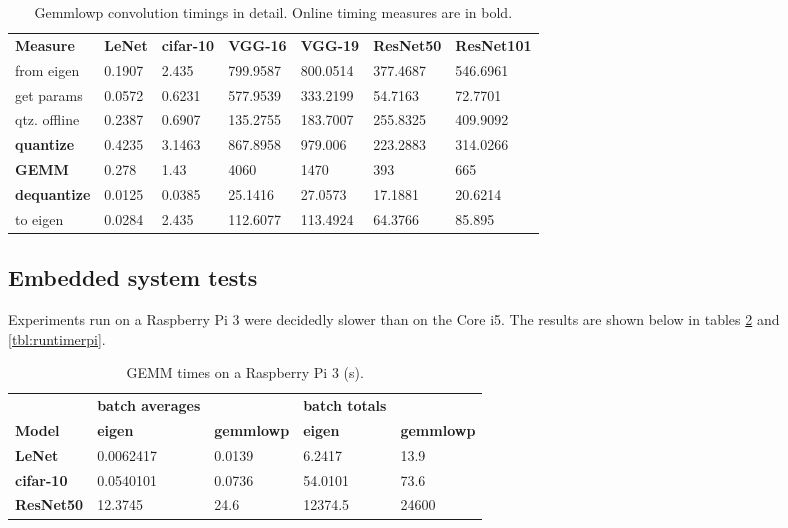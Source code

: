 \begin{table}[]
\centering
\caption[Gemmlowp convolution timings in detail]{Gemmlowp convolution timings in detail. Online timing measures are in bold.}
\label{tbl:detailedgemmlowp}
\begin{tabular}{lllllll}
\textbf{Measure}	& \textbf{LeNet} & \textbf{cifar-10} & \textbf{VGG-16} & \textbf{VGG-19} & \textbf{ResNet50} & \textbf{ResNet101} \\
from eigen & 0.1907         & 2.435              & 799.9587            & 800.0514            & 377.4687               & 546.6961                \\       
get params          & 0.0572         & 0.6231            & 577.9539         & 333.2199         & 54.7163           & 72.7701           \\
qtz. offline    & 0.2387         & 0.6907            & 135.2755        & 183.7007         & 255.8325          & 409.9092			\\   
\textbf{quantize}             & 0.4235         & 3.1463           & 867.8958        & 979.006        & 223.2883          & 314.0266            \\
\textbf{GEMM}                 & 0.278          & 1.43              & 4060            & 1470            & 393             & 665              \\       
\textbf{dequantize}           & 0.0125         & 0.0385            & 25.1416        & 27.0573        & 17.1881          & 20.6214            \\
to eigen   & 0.0284         & 2.435             & 112.6077       & 113.4924        & 64.3766          & 85.895    
\end{tabular}
\end{table}

\subsection{Embedded system tests}
Experiments run on a Raspberry Pi 3 were decidedly slower than on the Core i5. The results are shown below in tables \ref{tbl:gemmtimerpi} and \ref{tbl:runtimerpi}.

\begin{table}[]
\centering
\caption[Raspberry Pi GEMM timings]{GEMM times on a Raspberry Pi 3 (s).}
\label{tbl:gemmtimerpi}
\begin{tabular}{lllll}
                  & \textbf{batch averages} &                   & \textbf{batch totals} &                   \\
\textbf{Model}    & \textbf{eigen}         & \textbf{gemmlowp} & \textbf{eigen}        & \textbf{gemmlowp} \\
\textbf{LeNet}    & 0.0062417               & 0.0139            & 6.2417                & 13.9           	\\
\textbf{cifar-10} & 0.0540101               & 0.0736            & 54.0101               & 73.6           	\\
\textbf{ResNet50} & 12.3745              	& 24.6        		& 12374.5          		& 24600       
\end{tabular}
\end{table}

